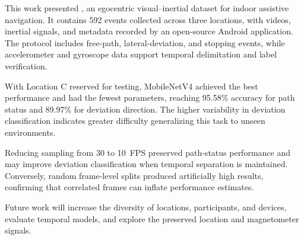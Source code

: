 ﻿This work presented \sensecv{}, an egocentric visual--inertial dataset for indoor assistive navigation. It contains 592 events collected across three locations, with videos, inertial signals, and metadata recorded by an open-source Android application. The protocol includes free-path, lateral-deviation, and stopping events, while accelerometer and gyroscope data support temporal delimitation and label verification.

With Location C reserved for testing, MobileNetV4 achieved the best performance and had the fewest parameters, reaching 95.58\% accuracy for path status and 89.97\% for deviation direction. The higher variability in deviation classification indicates greater difficulty generalizing this task to unseen environments.

Reducing sampling from 30 to 10~FPS preserved path-status performance and may improve deviation classification when temporal separation is maintained. Conversely, random frame-level splits produced artificially high results, confirming that correlated frames can inflate performance estimates.

Future work will increase the diversity of locations, participants, and devices, evaluate temporal models, and explore the preserved location and magnetometer signals.
